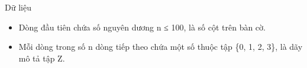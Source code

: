 Dữ liệu
\begin{itemize}
	\item     Dòng đầu tiên chứa số nguyên dương n ≤ 100, là số cột trên bàn cờ.   
	\item     Mỗi dòng trong số n dòng tiếp theo chứa một số thuộc tập \{0, 1, 2, 3\}, là dãy mô tả tập Z.   
\end{itemize}